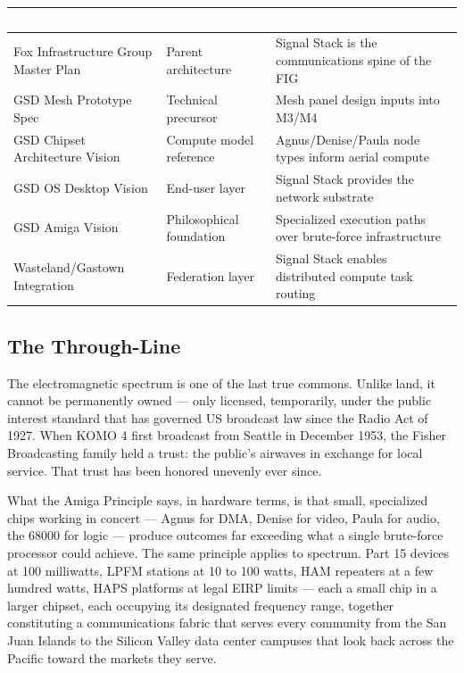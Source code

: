 \documentclass[11pt,letterpaper]{article}
\newcommand{\tableheader}[1]{\textbf{\sffamily\textcolor{white}{#1}}}
\begin{document}
\begin{center}
\begin{tabularx}{\textwidth}{L{4cm}L{4cm}X}
\toprule
{}
\tableheader{Document} & \tableheader{Relationship} & \tableheader{Note} \\
\midrule
Fox Infrastructure Group Master Plan & Parent architecture & Signal Stack is the communications spine of the FIG \\
GSD Mesh Prototype Spec & Technical precursor & Mesh panel design inputs into M3/M4 \\
GSD Chipset Architecture Vision & Compute model reference & Agnus/Denise/Paula node types inform aerial compute \\
GSD OS Desktop Vision & End-user layer & Signal Stack provides the network substrate \\
GSD Amiga Vision & Philosophical foundation & Specialized execution paths over brute-force infrastructure \\
Wasteland/Gastown Integration & Federation layer & Signal Stack enables distributed compute task routing \\
\bottomrule
\end{tabularx}
\end{center}

\subsection{The Through-Line}

The electromagnetic spectrum is one of the last true commons. Unlike land, it cannot be permanently owned --- only licensed, temporarily, under the public interest standard that has governed US broadcast law since the Radio Act of 1927. When KOMO 4 first broadcast from Seattle in December 1953, the Fisher Broadcasting family held a trust: the public's airwaves in exchange for local service. That trust has been honored unevenly ever since.

What the Amiga Principle says, in hardware terms, is that small, specialized chips working in concert --- Agnus for DMA, Denise for video, Paula for audio, the 68000 for logic --- produce outcomes far exceeding what a single brute-force processor could achieve. The same principle applies to spectrum. Part 15 devices at 100 milliwatts, LPFM stations at 10 to 100 watts, HAM repeaters at a few hundred watts, HAPS platforms at legal EIRP limits --- each a small chip in a larger chipset, each occupying its designated frequency range, together constituting a communications fabric that serves every community from the San Juan Islands to the Silicon Valley data center campuses that look back across the Pacific toward the markets they serve.
\end{document}
